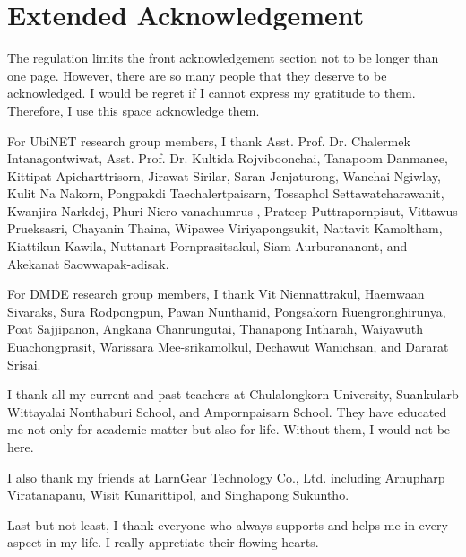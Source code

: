 \chapter{Extended Acknowledgement} 
The regulation limits the front acknowledgement section not to be longer than one page. However, there are so many people  that they deserve to be acknowledged. I would be regret if I cannot express my gratitude to them. Therefore, I use this space acknowledge them.

For UbiNET research group members, I thank Asst. Prof. Dr. Chalermek Intanagontwiwat, Asst. Prof. Dr.  Kultida Rojviboonchai, Tanapoom Danmanee, Kittipat Apicharttrisorn, Jirawat Sirilar, Saran Jenjaturong, Wanchai Ngiwlay, Kulit Na Nakorn, Pongpakdi Taechalertpaisarn, Tossaphol Settawatcharawanit, Kwanjira Narkdej, Phuri Nicro-vanachumrus , Prateep Puttrapornpisut, Vittawus Prueksasri, Chayanin Thaina, Wipawee	Viriyapongsukit, Nattavit Kamoltham, Kiattikun Kawila, Nuttanart Pornprasitsakul, Siam Aurburananont, and Akekanat Saowwapak-adisak. 

For DMDE research group members, I thank Vit Niennattrakul, Haemwaan Sivaraks, Sura Rodpongpun, Pawan Nunthanid, Pongsakorn Ruengronghirunya, Poat Sajjipanon, Angkana Chanrungutai, Thanapong Intharah, Waiyawuth Euachongprasit, Warissara Mee-srikamolkul, Dechawut Wanichsan, and Dararat Srisai.

I thank all my current and past teachers at Chulalongkorn University, Suankularb Wittayalai Nonthaburi School, and Ampornpaisarn School. They have educated me not only for academic matter but also for life. Without them, I would not be here.

I also thank my friends at LarnGear Technology Co., Ltd. including Arnupharp Viratanapanu, Wisit Kunarittipol, and Singhapong Sukuntho.

Last but not least, I thank everyone who always supports and helps me in every aspect in my life. I really appretiate their flowing hearts.

